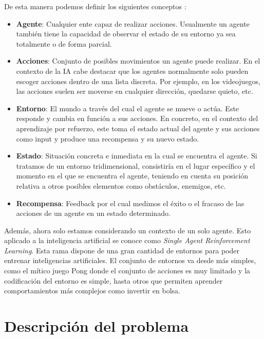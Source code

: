 De esta manera podemos definir los siguientes conceptos \cite {wiki_path}:
\begin{itemize}
	\item \textbf{Agente}: Cualquier ente capaz de realizar acciones. Usualmente un agente también tiene la capacidad de observar el estado de su entorno ya sea totalmente o de forma parcial.
	\item \textbf{Acciones}: Conjunto de posibles movimientos un agente puede realizar. En el contexto de la IA cabe destacar que los agentes normalmente solo pueden escoger acciones dentro de una lista discreta. Por ejemplo, en los videojuegos, las acciones suelen ser moverse en cualquier dirección, quedarse quieto, etc.
	\item \textbf{Entorno}: El mundo a través del cual el agente se mueve o actúa. Este responde y cambia en función a sus acciones. En concreto, en el contexto del aprendizaje por refuerzo, este toma el estado actual del agente y sus acciones como input y produce una recompensa y su nuevo estado.
	\item \textbf{Estado}: Situación concreta e inmediata en la cual se encuentra el agente. Si tratamos de un entorno tridimensional, consistiría en el lugar específico y el momento en el que se encuentra el agente, teniendo en cuenta su posición relativa a otros posibles elementos como obstáculos, enemigos, etc.
	\item \textbf{Recompensa}: Feedback por el cual medimos el éxito o el fracaso de las acciones de un agente en un estado determinado.  
\end{itemize}

Además, ahora solo estamos considerando un contexto de un solo agente. Esto aplicado a la inteligencia artificial se conoce como \emph{Single Agent Reinforcement Learning}. Esta rama dispone de una gran cantidad de entornos para poder entrenar inteligencias artificiales. El conjunto de entornos va desde más simples, como el mítico juego Pong donde el conjunto de acciones es muy limitado y la codificación del entorno es simple, hasta otros que permiten aprender comportamientos más complejos como invertir en bolsa.

\section{Descripción del problema}

